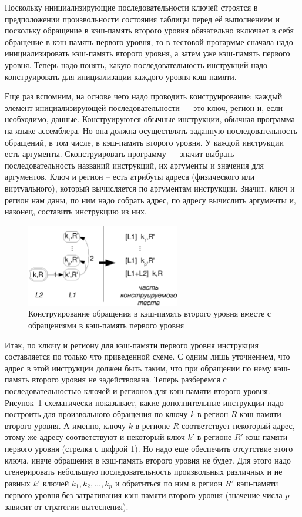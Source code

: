 Поскольку инициализирующие последовательности ключей строятся в предположении
произвольности состояния таблицы перед её выполнением и поскольку обращение в
кэш-память второго уровня обязательно включает в себя обращение в кэш-память
первого уровня, то в тестовой прогармме сначала надо инициализировать кэш-память
второго уровня, а затем уже кэш-память первого уровня. Теперь надо понять, какую
последовательность инструкций надо конструировать для инициализации каждого
уровня кэш-памяти.

Еще раз вспомним, на основе чего надо проводить конструирование: каждый элемент
инициализирующей последовательности --- это ключ, регион и, если необходимо, данные.
Конструируются обычные инструкции, обычная программа на языке ассемблера. Но она
должна осуществлять заданную последовательность обращений, в том числе, в
кэш-память второго уровня. У каждой инструкции есть аргументы. Сконструировать
программу --- значит выбрать последовательность названий инструкций, их аргументы и значения
для аргументов. Ключ и регион -- есть атрибуты адреса (физического или
виртуального), который вычисляется по аргументам инструкции. Значит, ключ и
регион нам даны, по ним надо собрать адрес, по адресу вычислить аргументы и,
наконец, составить инструкцию из них.

\begin{figure}[h] \centering
\includegraphics[width=0.6\textwidth]{2.theor/L1L2}
\caption{Конструирование обращения в кэш-память второго уровня вместе с
обращениями в кэш-память первого уровня}\label{fig:L1L2}
\end{figure}

Итак, по ключу и региону для кэш-памяти первого уровня
инструкция составляется по только что приведенной схеме. С одним лишь
уточнением, что адрес в этой инструкции должен быть таким, что при обращении по нему кэш-память
второго уровня не задействована. Теперь разберемся с последовательностью ключей
и регионов для кэш-памяти второго уровня. Рисунок~\ref{fig:L1L2} схематически
показывает, какие дополнительные инструкции надо построить для произвольного
обращения по ключу $k$ в регион $R$ кэш-памяти второго уровня. А именно, ключу
$k$ в регионе $R$ соответствует некоторый адрес, этому же адресу соответствуют и
некоторый ключ $k'$ в регионе $R'$ кэш-памяти первого уровня (стрелка с цифрой
1). Но надо еще обеспечить отсутствие этого ключа, иначе обращения в кэш-память
второго уровня не будет. Для этого надо сгенерировать небольшую
последовательность произвольных различных и не равных $k'$ ключей $k_1, k_2,
\dots, k_p$ и обратиться по ним в регион $R'$ кэш-памяти первого уровня без
затрагивания кэш-памяти второго уровня (значение числа $p$ зависит от стратегии
вытеснения).

